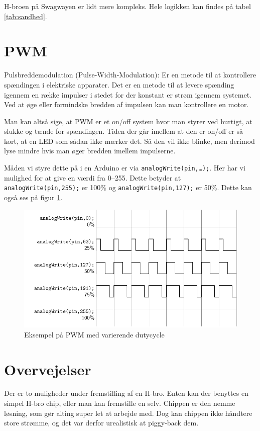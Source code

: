 \documentclass[a4paper,oneside,article,danish,table]{memoir}
\begin{document}
H-broen på Swagwayen er lidt mere kompleks. Hele logikken kan findes på tabel \ref{tab:sandhed}. 
\section{PWM}
Pulsbreddemodulation (Pulse-Width-Modulation): Er en metode til at kontrollere spændingen i elektriske
apparater. Det er en metode til at levere spænding igennem en række impulser i stedet for der konstant er strøm igennem systemet. Ved at øge eller formindske bredden af impulsen kan man kontrollere en motor.

Man kan altså sige, at PWM er et on/off system hvor man styrer ved hurtigt, at slukke og tænde for
spændingen. Tiden der går imellem at den er on/off er så kort, at en LED som sådan ikke mærker det. Så
den vil ikke blinke, men derimod lyse mindre hvis man øger bredden imellem impulserne.

Måden vi styre dette på i en Arduino er via \texttt{analogWrite(pin,\dots);}. Her har vi mulighed for at give en værdi fra 0--255. Dette betyder at \texttt{analogWrite(pin,255);} er 100\% og \texttt{analogWrite(pin,127);} er 50\%. Dette kan også ses på figur \ref{fig:pwm}.
\begin{figure}[htbp]
  \centering
  \includegraphics[width=\textwidth]{pictures/pwm.pdf}
  \caption{Eksempel på PWM med varierende dutycycle}
  \label{fig:pwm}
\end{figure}

\section{Overvejelser}
Der er to muligheder under fremstilling af en H-bro. Enten kan der benyttes en simpel H-bro chip, eller man kan fremstille en selv. Chippen er den nemme løsning, som gør alting super let at arbejde med. Dog kan chippen ikke håndtere store strømme, og det var derfor urealistisk at piggy-back dem.
\end{document}
